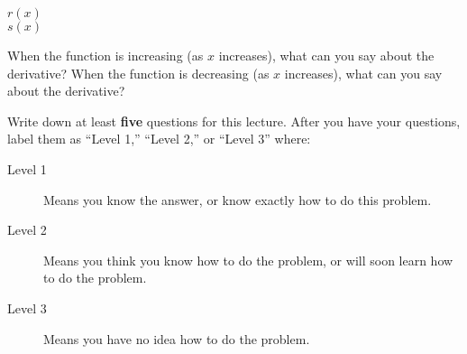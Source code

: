 \documentclass{ximera}
\begin{document}
\begin{question}
\begin{description}
\item[$r(x)$]
\begin{image} 
\end{image}

\item[$s(x)$]
\begin{image} 
\end{image}
\end{description}
\begin{hint}
When the function is increasing (as $x$ increases), what can you say
about the derivative? When the function is decreasing (as $x$
increases), what can you say about the derivative?
\end{hint}
\begin{multipleChoice}
\end{multipleChoice}
\end{question}




\begin{question}
Write down at least \textbf{five} questions for this lecture. After
you have your questions, label them as ``Level 1,'' ``Level 2,'' or ``Level 3'' where:
\begin{description}
\item[Level 1] Means you know the answer, or know exactly how to do this problem.
\item[Level 2] Means you think you know how to do the problem, or will soon learn how to do the problem.
\item[Level 3] Means you have no idea how to do the problem. 
\end{description}
  \begin{freeResponse}
  \end{freeResponse}
\end{question}
\end{document}

